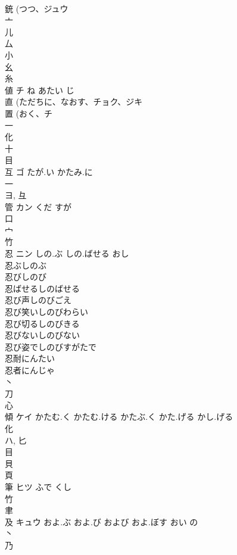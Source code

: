 \documentclass[8pt]{extreport}
\begin{document}
\begin{CJK}{UTF8}{min}
\\	銃 (つつ、ジュウ 
\\	亠 
\\	儿 
\\	厶 
\\	小 
\\	幺 
\\	糸 
\\	値	チ	ね あたい じ	
\\	直 (ただちに、なおす、チョク、ジキ 
\\	置 (おく、チ 
\\	一 
\\	化 
\\	十 
\\	目 
\\	互	ゴ	たが.い かたみ.に	
\\	一 
\\	ヨ, 彑 
\\	管	カン	くだ すが	
\\	口 
\\	宀 
\\	竹 
\\	忍	ニン	しの.ぶ しの.ばせる おし	
\\	忍ぶしのぶ 
\\	忍びしのび 
\\	忍ばせるしのばせる 
\\	忍び声しのびごえ 
\\	忍び笑いしのびわらい 
\\	忍び切るしのびきる 
\\	忍びないしのびない 
\\	忍び姿でしのびすがたで 
\\	忍耐にんたい 
\\	忍者にんじゃ 
\\	丶 
\\	刀 
\\	心 
\\	傾	ケイ	かたむ.く かたむ.ける かたぶ.く かた.げる かし.げる	
\\	化 
\\	ハ, 匕 
\\	目 
\\	貝 
\\	頁 
\\	筆	ヒツ	ふで くし	
\\	竹 
\\	聿 
\\	及	キュウ	およ.ぶ およ.び および およ.ぼす おい の	
\\	丶 
\\	乃 

\end{CJK}
\end{document}
